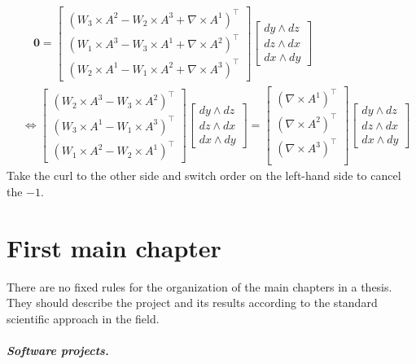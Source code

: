 \documentclass[a4paper,twoside,openright,11pt]{report}
\begin{document}
\begin{align*}
  & \hspace{1em}\bm{0} = \begin{bmatrix}
    (W_3 \times A^2 - W_2 \times A^3 + \nabla \times A^1)^{\top} \\
    (W_1 \times A^3 - W_3 \times A^1+ \nabla \times A^2)^{\top} \\
    (W_2 \times A^1 - W_1 \times A^2 + \nabla \times A^3)^{\top}
  \end{bmatrix}\begin{bmatrix}
    dy \wedge dz \\ dz \wedge dx \\ dx \wedge dy
  \end{bmatrix} \\
  & \iff 
  \begin{bmatrix}
    (W_2 \times A^3 - W_3 \times A^2)^{\top}  \\ 
    (W_3 \times A^1 - W_1 \times A^3)^{\top}  \\
    (W_1 \times A^2 - W_2 \times A^1)^{\top}
  \end{bmatrix}
  \begin{bmatrix}
    dy \wedge dz \\ dz \wedge dx \\ dx \wedge dy
  \end{bmatrix}
  =
  \begin{bmatrix}
    (\nabla \times A^1)^{\top} \\
    (\nabla \times A^2)^{\top} \\
    (\nabla \times A^3)^{\top} \\
  \end{bmatrix}
  \begin{bmatrix}
    dy \wedge dz \\ dz \wedge dx \\ dx \wedge dy
  \end{bmatrix}
\end{align*}
Take the curl to the other side and switch order on the left-hand side to cancel the $-1$.
\chapter{First main chapter}

There are no fixed rules for the organization of the main chapters in a
thesis.  They should describe the project and its results according to the
standard scientific approach in the field.

\paragraph{Software projects.}
\end{document}
